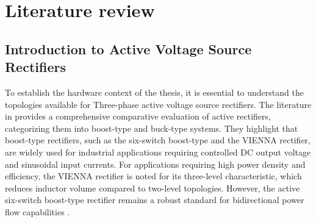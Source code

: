 \section{Literature review}
\subsection{Introduction to Active Voltage Source Rectifiers}
To establish the hardware context of the thesis, it is essential to understand the topologies available 
for Three-phase active voltage source rectifiers. The literature in \cite{electronics12112417,Abo-Khalil2021,friedli2014} provides a comprehensive
comparative evaluation of active rectifiers, categorizing them into boost-type and buck-type systems. 
They highlight that boost-type rectifiers, such as the six-switch boost-type and the VIENNA rectifier, 
are widely used for industrial applications requiring controlled DC output voltage and sinusoidal input currents. 
For applications requiring high power density and efficiency, the VIENNA rectifier is noted for its three-level 
characteristic, which reduces inductor volume compared to two-level topologies. However, the active six-switch 
boost-type rectifier remains a robust standard for bidirectional power flow capabilities \cite{friedli2014}.\par
